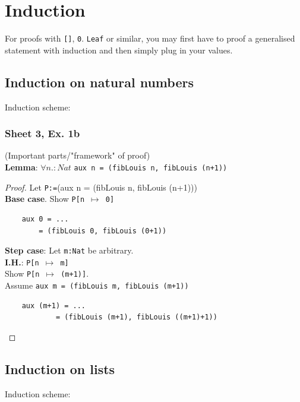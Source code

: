 \documentclass{article}
\def\fan{\forall n. : Nat}
\begin{document}
\section{Induction}
For proofs with \texttt{[]}, \texttt{0}. \texttt{Leaf} or similar, you may first have to proof a generalised statement with induction and then simply plug in your values.
\subsection{Induction on natural numbers}
Induction scheme:
\begin{prooftree}
\end{prooftree}

\subsubsection{Sheet 3, Ex. 1b}
(Important parts/"framework" of proof) \\
\textbf{Lemma}: $\fan$ \texttt{aux n = (fibLouis n, fibLouis (n+1))}
\begin{proof}
    Let \texttt{P:=}(aux n = (fibLouis n, fibLouis (n+1)))\\
    \textbf{Base case}. Show \texttt{P[n $\mapsto$ 0]} 
    \begin{verbatim}
    aux 0 = ...
        = (fibLouis 0, fibLouis (0+1))
    \end{verbatim}
    \textbf{Step case}: Let \texttt{m:Nat} be arbitrary. \\
    \textbf{I.H.}: \texttt{P[n $\mapsto$ m]} \\
    Show \texttt{P[n $\mapsto$ (m+1)]}. \\
    Assume \texttt{aux m = (fibLouis m, fibLouis (m+1))}
    \begin{verbatim}
    aux (m+1) = ...
            = (fibLouis (m+1), fibLouis ((m+1)+1)) 
    \end{verbatim}
\end{proof}

\subsection{Induction on lists}

Induction scheme:
\begin{prooftree}
\end{prooftree}
\end{document}
